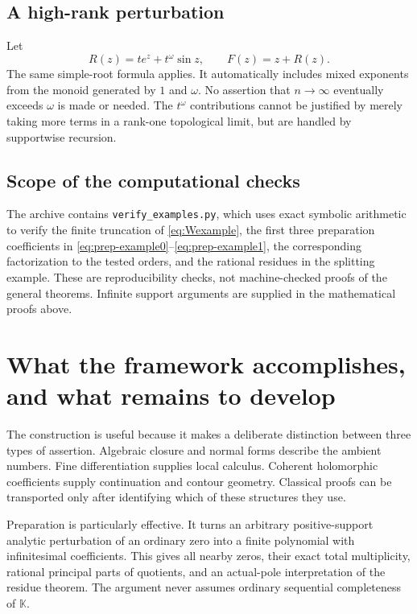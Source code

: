 \documentclass[11pt,letterpaper]{article}
\numberwithin{equation}{section}
\theoremstyle{definition}
\theoremstyle{remark}
\newcommand{\K}{\mathbb{K}}
\begin{document}
\subsection{A high-rank perturbation}

Let
\[
 R(z)=t e^z+t^\omega\sin z,
 \qquad F(z)=z+R(z).
\]
The same simple-root formula applies. It automatically includes mixed
exponents from the monoid generated by $1$ and $\omega$. No assertion that
$n\to\infty$ eventually exceeds $\omega$ is made or needed. The
$t^\omega$ contributions cannot be justified by merely taking more terms
in a rank-one topological limit, but are handled by supportwise recursion.

\subsection{Scope of the computational checks}

The archive contains \texttt{verify\_examples.py}, which uses exact symbolic
arithmetic to verify the finite truncation of \eqref{eq:Wexample}, the first
three preparation coefficients in
\eqref{eq:prep-example0}--\eqref{eq:prep-example1}, the corresponding
factorization to the tested orders, and the rational residues in the
splitting example. These are reproducibility checks, not machine-checked
proofs of the general theorems. Infinite support arguments are supplied in
the mathematical proofs above.

\section{What the framework accomplishes, and what remains to develop}\label{sec:outlook}

The construction is useful because it makes a deliberate distinction between
three types of assertion. Algebraic closure and normal forms describe the
ambient numbers. Fine differentiation supplies local calculus. Coherent
holomorphic coefficients supply continuation and contour geometry. Classical
proofs can be transported only after identifying which of these structures
they use.

Preparation is particularly effective. It turns an arbitrary positive-support
analytic perturbation of an ordinary zero into a finite polynomial with
infinitesimal coefficients. This gives all nearby zeros, their exact total
multiplicity, rational principal parts of quotients, and an actual-pole
interpretation of the residue theorem. The argument never assumes ordinary
sequential completeness of $\K$.
\end{document}
